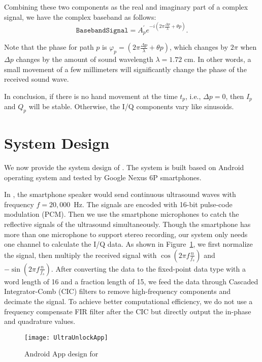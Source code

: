 Combining these two components as the real and imaginary part of a complex signal, we have the complex baseband as follows: 
\begin{displaymath}
\texttt{BasebandSignal} = A^\prime_p e^{-i \left(2 \pi \frac{\Delta p}{\lambda} + \theta p\right)}.
\end{displaymath}

Note that the phase for path $p$ is $\varphi_p = \left(2 \pi \frac{\Delta p}{\lambda} + \theta p\right)$, which changes by $2\pi$ when $\Delta p$ changes by the amount of sound wavelength $\lambda = 1.72 \text{~cm}$. In other words, a small
movement of a few millimeters will significantly change the phase of the received sound wave. 

In conclusion, if there is no hand movement at the time $t_p$, i.e., $\Delta p = 0$, then $I_p$ and $Q_p$ will be stable. Otherwise, the I/Q components vary like sinusoids.


\section{System Design}
We now provide the system design of {\uu}. The system is built based on Android operating system and tested by Google Nexus 6P smartphones.

In {\uu}, the smartphone speaker would send continuous ultrasound waves with frequency $f = 20,000 $~Hz. The signals are encoded with 16-bit pulse-code modulation (PCM). Then we use the smartphone microphones to catch the reflective signals of the ultrasound simultaneously. Though the smartphone has more than one microphone to support stereo recording, our system only needs one channel to calculate the I/Q data. 
As shown in Figure~\ref{fig:ultraunlockapp}, we first normalize the signal, then multiply the received signal with $\cos \left (2\pi f \frac{n}{f_s}\right)$ and $-\sin \left (2\pi f \frac{n}{f_s}\right)$. After converting the data to the fixed-point data type with a word length of 16 and a fraction length of 15, we feed the data through Cascaded Integrator-Comb (CIC) filters to remove high-frequency components and decimate the signal. To achieve better computational efficiency, we do not use a frequency compensate FIR filter after the CIC but directly output the in-phase and quadrature values.



\begin{landscape}
	\begin{figure}[h]
		\centering
		\vspace{-1.7in}
		\texttt{[image: UltraUnlockApp]}
		\vspace{-1.5in}
		\caption{Android App design for {\uu}}
		\label{fig:ultraunlockapp}
	\end{figure}
\end{landscape}




